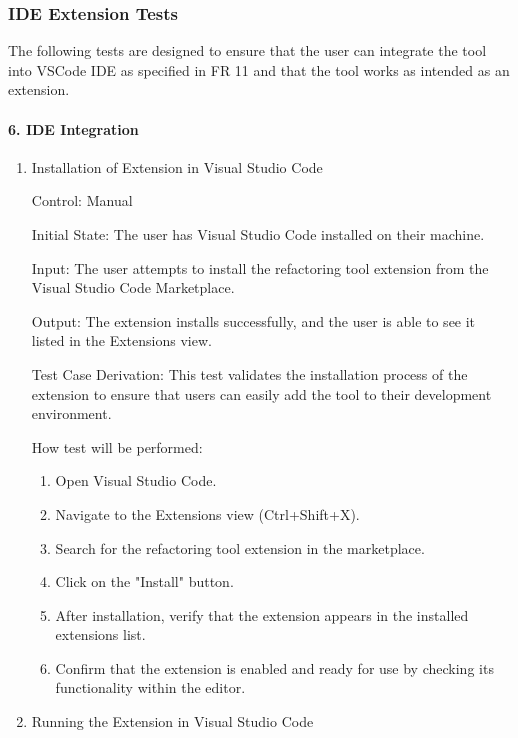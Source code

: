 \documentclass[12pt, titlepage]{article}
\begin{document}
\subsubsection{IDE Extension Tests}

The following tests are designed to ensure that the user can integrate the tool into VSCode IDE as specified in FR 11 and that the tool works as intended as an extension.
		
\paragraph{6. IDE Integration}
\begin{enumerate}
  \item{Installation of Extension in Visual Studio Code\\}

  Control: Manual
  
  Initial State: The user has Visual Studio Code installed on their machine.
  
  Input: The user attempts to install the refactoring tool extension from the Visual Studio Code Marketplace.
  
  Output: The extension installs successfully, and the user is able to see it listed in the Extensions view.
  
  Test Case Derivation: This test validates the installation process of the extension to ensure that users can easily add the tool to their development environment.
  
  How test will be performed: 
  \begin{enumerate}
      \item Open Visual Studio Code.
      \item Navigate to the Extensions view (Ctrl+Shift+X).
      \item Search for the refactoring tool extension in the marketplace.
      \item Click on the "Install" button.
      \item After installation, verify that the extension appears in the installed extensions list.
      \item Confirm that the extension is enabled and ready for use by checking its functionality within the editor.
  \end{enumerate}

  \item{Running the Extension in Visual Studio Code\\}


\end{enumerate}
\end{document}
